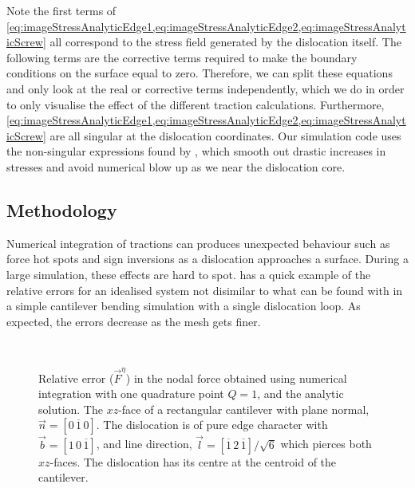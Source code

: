 Note the first terms of \cref{eq:imageStressAnalyticEdge1,eq:imageStressAnalyticEdge2,eq:imageStressAnalyticScrew} all correspond to the stress field generated by the dislocation itself. The following terms are the corrective terms required to make the boundary conditions on the surface equal to zero. Therefore, we can split these equations and only look at the real or corrective terms independently, which we do in order to only visualise the effect of the different traction calculations. Furthermore, \cref{eq:imageStressAnalyticEdge1,eq:imageStressAnalyticEdge2,eq:imageStressAnalyticScrew} are all singular at the dislocation coordinates. Our simulation code uses the non-singular expressions found by \citet{a_non-singular_continuum_theory_of_dislocations}, which smooth out drastic increases in stresses and avoid numerical blow up as we near the dislocation core.

\subsection{Methodology}\label{ss:paperMethod}

Numerical integration of tractions can produces unexpected behaviour such as force hot spots and sign inversions as a dislocation approaches a surface. During a large simulation, these effects are hard to spot.  has a quick example of the relative errors for an idealised system not disimilar to what can be found with in a simple cantilever bending simulation with a single dislocation loop. As expected, the errors decrease as the mesh gets finer.
\begin{figure}
    \centering
    ~
    \caption[Relative error comparison of analytic v.s. numeric tractions on a surface as a function of mesh coarseness.]{Relative error ($\vec{F}^{\eta}$) in the nodal force obtained using numerical integration with one quadrature point $Q = 1$, and the analytic solution. The $xz$-face of a rectangular cantilever with plane normal, $\vec{n} = \left[0\,\overline{1}\,0\right]$. The dislocation is of pure edge character with $\vec{b} = [1\,0\,\overline{1}]$, and line direction, $\vec{l} = \left[\overline{1}\,2\,\overline{1}\right]/\sqrt{6}$ which pierces both $xz$-faces. The dislocation has its centre at the centroid of the cantilever.}
    \label{f:err_basic_cantilever}
\end{figure}

